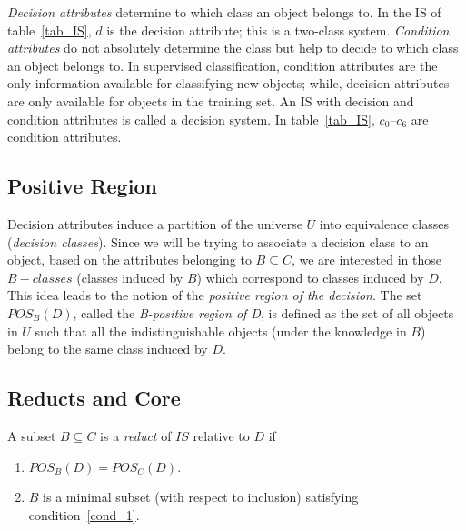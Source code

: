 \documentclass[authoryear,preprint,review,12pt]{elsarticle}
\begin{document}
  \textit{Decision attributes} determine to which class an object belongs to. In the IS of
  table~\ref{tab_IS}, $d$ is the decision attribute; this is a two-class system. \textit{Condition attributes} 
  do not absolutely determine the class but help to decide to which class an object belongs to. In supervised 
  classification, condition attributes are the only information available for classifying new objects; while, 
  decision attributes are only available for objects in the training set. An IS with decision and 
  condition attributes is called a decision system. In table~\ref{tab_IS}, $c_0$--$c_6$ are condition 
  attributes.
  
\subsection{Positive Region}\label{subsect_Pos}
  Decision attributes induce a partition of the universe $U$ into equivalence classes 
  (\textit{decision classes}). Since we will be trying to associate a decision class to an object, 
  based on the attributes belonging to $B \subseteq C$, we are interested in those $B-classes$ (classes induced by $B$) which correspond to classes induced by $D$. 
  This idea leads to the notion of the  \textit{positive region of the decision}. The set $POS_B(D)$, 
  called the \textit{B-positive region of D}, is defined as the set of all objects in $U$ such 
  that all the indistinguishable objects (under the knowledge in $B$) belong to the same class induced 
  by $D$.
%  
%  
 
\subsection{Reducts and Core}\label{def_reduct}
  A subset $B \subseteq C$ is a \textit{reduct} of $IS$ relative to $D$ if
  \begin{enumerate}
  	\item $POS_B(D)=POS_C(D)$. \label{cond_1}
  	\item $B$ is a minimal subset (with respect to inclusion) satisfying condition~\ref{cond_1}.\label{cond_2}
  \end{enumerate}
\end{document}
